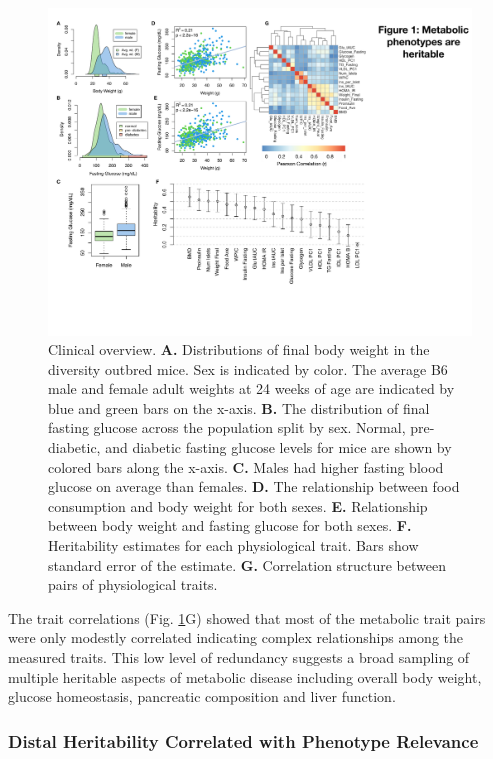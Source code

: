 \documentclass[
]{article}
\begin{document}
\begin{figure}[ht!]
\includegraphics[width=\textwidth]{Figures/Fig1_trait_overview.pdf} 
\caption{Clinical overview. \textbf{A.} Distributions of final body weight 
in the diversity outbred mice. Sex is indicated by color. The 
average B6 male and female adult weights at 24 weeks of age 
are indicated by blue and green bars on the x-axis. \textbf{B.} The 
distribution of final fasting glucose across the population split 
by sex. Normal, pre-diabetic, and diabetic fasting glucose levels 
for mice are shown by colored bars along the x-axis. \textbf{C.} Males had 
higher fasting blood glucose on average than females. \textbf{D.} The 
relationship between food consumption and body weight for both 
sexes. \textbf{E.} Relationship between body weight and fasting glucose 
for both sexes. \textbf{F.} Heritability estimates for each physiological 
trait. Bars show standard error of the estimate. \textbf{G.} Correlation 
structure between pairs of physiological traits.}
\label{fig:trait_overview}
\end{figure}

The trait correlations (Fig. \ref{fig:trait_overview}G) showed that most
of the metabolic trait pairs were only modestly correlated indicating
complex relationships among the measured traits. This low level of
redundancy suggests a broad sampling of multiple heritable aspects of
metabolic disease including overall body weight, glucose homeostasis,
pancreatic composition and liver function.

\subsubsection{Distal Heritability Correlated with Phenotype
Relevance}\label{distal-heritability-correlated-with-phenotype-relevance}
\end{document}
